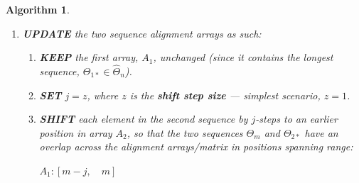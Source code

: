 \documentclass[a4paper, 18pt]{book} %
\newtheorem{alg}{Algorithm}
\newcommand{\invpi}{\rotatebox[origin=c]{180}{$\pi$}}
\begin{document}
\begin{alg}
\begin{enumerate}
{\vspace{1em}
 $A_1: [1, m]$
\vspace{1em}


While $\Theta_{2*}$ occupies positions in the range\footnote{We write ``$\Theta_{2*}[1]$" in our formulation here, to mean the first element in $\Theta_{2*}$ --- i.e. position 1 has value 1, and the nth position has value $n$, not usual (computer-science) $n-1$}:

\vspace{1em}
 $A_2: [(1 + I(\Theta_m[m], A_1)$, $\quad$ $I(\Theta_m[m], A_1) + \invpi(\Theta_{2*})]$
\vspace{1em}

Or, equivalently, the range:

\vspace{1em}
$A_2: [m+1,\quad m + \invpi(\Theta_{2*})]$. 
 \vspace{1em}

Which we can also express visually as:\\\\

\begin{tabular}[H]{|c||c|c|c|c|c|c|c|c|c|c|}
\hline
$A_1$ & $\cdots$ & $a_{1,1}$ & $a_{1,2}$ & $\cdots$ & $a_{1,m}$ & & & & & $\cdots$\\
\hline
$A_2$ & $\cdots$ & & & & & $a_{2,1}$ & $a_{2,2}$ & $\cdots$ & $a_{2,\invpi(\Theta_{2*})}$ & $\cdots$ \\
\hline
 
\end{tabular}\\\\


}
\item{
\textbf{UPDATE}  the two sequence alignment arrays as such:
\begin{enumerate}
\item{
\textbf{KEEP}  the first array, $A_1$, unchanged (since it contains the longest sequence, $\Theta_{1*} \in \hat{\Theta}_n$).
}
\item \textbf{SET}  $j = z$, where $z$ is the \textbf{shift step size} --- simplest scenario, $z = 1$.
\item {\textbf{SHIFT}  each element in the second sequence by $j$-steps to an earlier position in array $A_2$, so that the two sequences $\Theta_m$ and $\Theta_{2*}$ have an overlap across the alignment arrays/matrix in positions spanning range:

\vspace{1em}
 $A_1: [m-j,\quad m]$
\vspace{1em}
 
}
\end{enumerate}}
\end{enumerate}
\end{alg}
\end{document}
